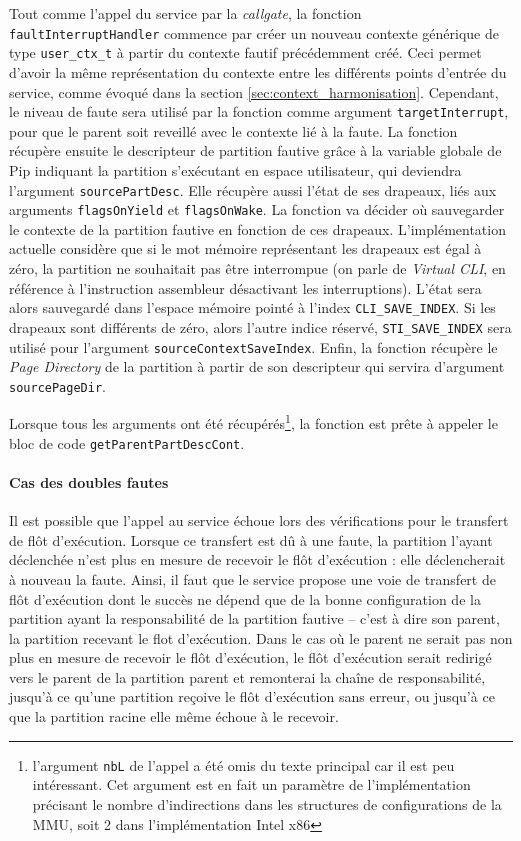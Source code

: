 		Tout comme l'appel du service par la \emph{callgate}, la fonction \texttt{faultInterruptHandler} commence par créer un nouveau contexte générique de type \texttt{user\_ctx\_t} à partir du contexte fautif précédemment créé. Ceci permet d'avoir la même représentation du contexte entre les différents points d'entrée du service, comme évoqué dans la section \ref{sec:context_harmonisation}. Cependant, le niveau de faute sera utilisé par la fonction comme argument \texttt{targetInterrupt}, pour que le parent soit reveillé avec le contexte lié à la faute.
		La fonction récupère ensuite le descripteur de partition fautive grâce à la variable globale de Pip indiquant la partition s'exécutant en espace utilisateur, qui deviendra l'argument \texttt{sourcePartDesc}. Elle récupère aussi l'état de ses drapeaux, liés aux arguments \texttt{flagsOnYield} et \texttt{flagsOnWake}. La fonction va décider où sauvegarder le contexte de la partition fautive en fonction de ces drapeaux. L'implémentation actuelle considère que si le mot mémoire représentant les drapeaux est égal à zéro, la partition ne souhaitait pas être interrompue (on parle de \emph{Virtual CLI}, en référence à l'instruction assembleur désactivant les interruptions). L'état sera alors sauvegardé dans l'espace mémoire pointé à l'index \texttt{CLI\_SAVE\_INDEX}. Si les drapeaux sont différents de zéro, alors l'autre indice réservé, \texttt{STI\_SAVE\_INDEX} sera utilisé pour l'argument \texttt{sourceContextSaveIndex}.
		Enfin, la fonction récupère le \emph{Page Directory} de la partition à partir de son descripteur qui servira d'argument \texttt{sourcePageDir}.

		Lorsque tous les arguments ont été récupérés\footnote{l'argument \texttt{nbL} de l'appel a été omis du texte principal car il est peu intéressant. Cet argument est en fait un paramètre de l'implémentation précisant le nombre d'indirections dans les structures de configurations de la MMU, soit 2 dans l'implémentation Intel x86}, la fonction est prête à appeler le bloc de code \texttt{getParentPartDescCont}.

		\paragraph{Cas des doubles fautes} Il est possible que l'appel au service échoue lors des vérifications pour le transfert de flôt d'exécution. Lorsque ce transfert est dû à une faute, la partition l'ayant déclenchée n'est plus en mesure de recevoir le flôt d'exécution : elle déclencherait à nouveau la faute. Ainsi, il faut que le service propose une voie de transfert de flôt d'exécution dont le succès ne dépend que de la bonne configuration de la partition ayant la responsabilité de la partition fautive -- c'est à dire son parent, la partition recevant le flot d'exécution.
		Dans le cas où le parent ne serait pas non plus en mesure de recevoir le flôt d'exécution, le flôt d'exécution serait redirigé vers le parent de la partition parent et remonterai la chaîne de responsabilité, jusqu'à ce qu'une partition reçoive le flôt d'exécution sans erreur, ou jusqu'à ce que la partition racine elle même échoue à le recevoir.

